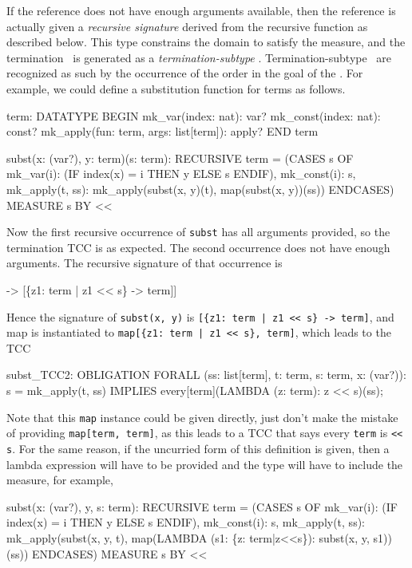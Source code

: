 If the reference does not have enough arguments available, then the
reference is actually given a \emph{recursive signature} derived from the recursive function as described below.  This
type constrains the domain to satisfy the measure, and the termination
\tcc\ is generated as a \emph{termination-subtype}
\tcc.
Termination-subtype \tccs\ are recognized as such by the occurrence of the
order in the goal of the \tcc.  For example, we could define a
substitution function for terms as follows.
\begin{pvsex}
  term: DATATYPE
  BEGIN
   mk_var(index: nat): var?
   mk_const(index: nat): const?
   mk_apply(fun: term, args: list[term]): apply?
  END term

  subst(x: (var?), y: term)(s: term): RECURSIVE term =
    (CASES s OF
      mk_var(i): (IF index(x) = i THEN y ELSE s ENDIF),
      mk_const(i): s,
      mk_apply(t, ss): mk_apply(subst(x, y)(t), map(subst(x, y))(ss))
     ENDCASES)
  MEASURE s BY <<
\end{pvsex}
Now the first recursive occurrence of \texttt{subst} has all arguments
provided, so the termination TCC is as expected.  The second occurrence
does not have enough arguments.  The recursive signature of that
occurrence is
\begin{pvsex}
  [[(var?), term] -> [\{z1: term | z1 << s\} -> term]]
\end{pvsex}
Hence the signature of \texttt{subst(x, y)} is \texttt{[\{z1:\ term | z1 <<
s\} -> term]}, and map is instantiated to \texttt{map[\{z1:\ term | z1 <<
s\}, term]}, which leads to the TCC
\begin{pvsex}
subst_TCC2: OBLIGATION
  FORALL (ss: list[term], t: term, s: term, x: (var?)):
    s = mk_apply(t, ss) IMPLIES every[term](LAMBDA (z: term): z << s)(ss);
\end{pvsex}
Note that this \texttt{map} instance could be given directly, just don't
make the mistake of providing \texttt{map[term, term]}, as this leads to a
TCC that says every \texttt{term} is \texttt{<<} \texttt{s}.
For the same reason, if the uncurried form of this definition is given,
then a lambda expression will have to be provided and the type will have
to include the measure, for example,
\begin{pvsex}
   subst(x: (var?), y, s: term): RECURSIVE term =
     (CASES s OF
       mk_var(i): (IF index(x) = i THEN y ELSE s ENDIF),
       mk_const(i): s,
       mk_apply(t, ss): mk_apply(subst(x, y, t),
                                 map(LAMBDA (s1: \{z: term|z<<s\}):
                                       subst(x, y, s1))(ss))
      ENDCASES)
   MEASURE s BY <<
\end{pvsex}

